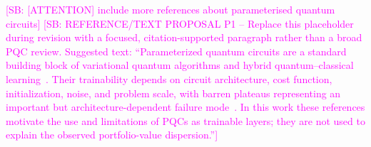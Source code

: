 \documentclass[aps,floatfix,superscriptaddress,twocolumn,tightenlines,amsmath,amssymb,nofootinbib,10pt,longbibliography,prl]{revtex4-2}
\newcommand{\sam}[1]{\textcolor{magenta}{[SB: {#1}]}}
\begin{document}
\sam{[ATTENTION] include more references about parameterised quantum circuits}
\sam{REFERENCE/TEXT PROPOSAL P1 -- Replace this placeholder during revision with a focused, citation-supported paragraph rather than a broad PQC review. Suggested text: ``Parameterized quantum circuits are a standard building block of variational quantum algorithms and hybrid quantum--classical learning~\cite{Benedetti2019Parameterizedquant,Cerezo2021Variationalquantum}. Their trainability depends on circuit architecture, cost function, initialization, noise, and problem scale, with barren plateaus representing an important but architecture-dependent failure mode~\cite{McClean2018Barrenplateausinqu,Larocca2025BarrenPlateaus}. In this work these references motivate the use and limitations of PQCs as trainable layers; they are not used to explain the observed portfolio-value dispersion.''}


\end{document}
